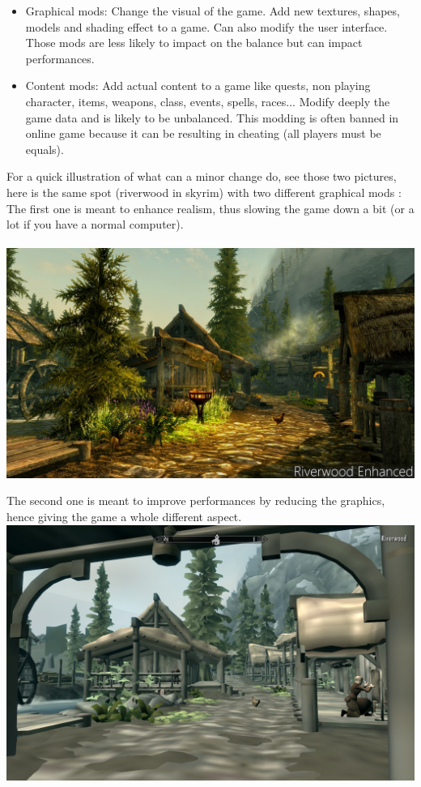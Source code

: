 \documentclass[a4paper,12pt]{article}
\begin{document}
\begin{itemize}
\item Graphical mods: Change the visual of the game. Add new textures, shapes, models and shading effect to a game. Can also modify the user interface. Those mods are less likely to impact on the balance but can impact performances.
\item Content mods: Add actual content to a game like quests, non playing character, items, weapons, class, events, spells, races... Modify deeply the game data and is likely to be unbalanced. This modding is often banned in online game because it can be resulting in cheating (all players must be equals).
\end{itemize}
For a quick illustration of what can a minor change do, see those two pictures, here is the same spot (riverwood in skyrim) with two different graphical mods :
The first one is meant to enhance realism, thus slowing the game down a bit (or a lot if you have a normal computer).\\~\\
\includegraphics[keepaspectratio=true, width=13.7cm]{./riverwood-HD.jpg}

The second one is meant to improve performances by reducing the graphics, hence giving the game a whole different aspect.\\
\includegraphics[keepaspectratio=true, width=13.7cm]{./riverwood-LD.jpg}
\end{document}
